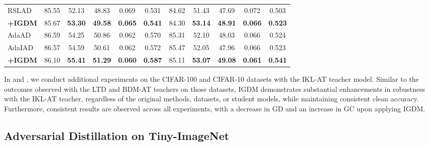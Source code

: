 \documentclass{article} %
\begin{document}
\begin{table}[h]
\begin{tabular}{lcccccccccc}
 RSLAD & 85.55 & 52.13 & 48.83 & 0.069 & 0.531 & 84.62& 51.43 & 47.69 & 0.072 
& 0.503\\
 \textbf{+IGDM} & 85.67& \textbf{53.30} & \textbf{49.58} & \textbf{0.065} & \textbf{0.541} & 84.30& \textbf{53.14} & \textbf{48.91} & 
\textbf{0.066} 
& 
\textbf{0.523}\\
 \midrule
 AdaAD & 86.59& 54.25 & 50.86 & 0.062 & 0.570 & 85.31 & 52.10 & 48.03 & 0.066 
& 0.524\\
 AdaIAD & 86.57& 54.59& 50.61& 0.062& 0.572& 85.47& 52.05& 47.96& 0.066& 
0.523\\
 \textbf{+IGDM} & 86.10 & \textbf{55.41} & \textbf{51.29} & \textbf{0.060} & \textbf{0.587} & 85.11& \textbf{53.07} & \textbf{49.08} & \textbf{0.061} & \textbf{0.541}\\

\bottomrule
 \end{tabular}
 \label{tab:ikl_at_cifar10}
\end{table}
In  and , we conduct additional experiments on the CIFAR-100 and CIFAR-10 datasets with the IKL-AT \citep{cui2023decoupled} teacher model.
Similar to the outcomes observed with the LTD \citep{LTD} and BDM-AT \citep{wang2023better} teachers on those datasets, IGDM demonstrates substantial enhancements in robustness with the IKL-AT teacher, regardless of the original methods, datasets, or student models, while maintaining consistent clean accuracy.
Furthermore, consistent results are observed across all experiments, with a decrease in GD and an increase in GC upon applying IGDM.

\subsection{Adversarial Distillation on Tiny-ImageNet}
\label{sec:diff_dataset}
\end{document}
